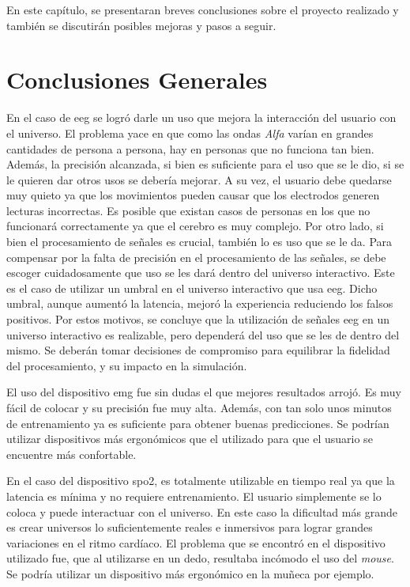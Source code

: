 En este capítulo, se presentaran breves conclusiones sobre el proyecto realizado y también se discutirán posibles mejoras y pasos a seguir.

\section{Conclusiones Generales}

En el caso de \acrshort{eeg} se logró darle un uso que mejora la interacción del usuario con el universo. El problema yace en que como las ondas \emph{Alfa} varían en grandes cantidades de persona a persona, hay en personas que no funciona tan bien. Además, la precisión alcanzada, si bien es suficiente para el uso que se le dio, si se le quieren dar otros usos se debería mejorar. A su vez, el usuario debe quedarse muy quieto ya que los movimientos pueden causar que los electrodos generen lecturas incorrectas. Es posible que existan casos de personas en los que no funcionará correctamente ya que el cerebro es muy complejo. Por otro lado, si bien el procesamiento de señales es crucial, también lo es uso que se le da. Para compensar por la falta de precisión en el procesamiento de las señales, se debe escoger cuidadosamente que uso se les dará dentro del universo interactivo. Este es el caso de utilizar un umbral en el universo interactivo que usa \acrshort{eeg}. Dicho umbral, aunque aumentó la latencia, mejoró la experiencia reduciendo los falsos positivos. Por estos motivos, se concluye que la utilización de señales \acrshort{eeg} en un universo interactivo es realizable, pero dependerá del uso que se les de dentro del mismo. Se deberán tomar decisiones de compromiso para equilibrar la fidelidad del procesamiento, y su impacto en la simulación.

El uso del dispositivo \acrshort{emg} fue sin dudas el que mejores resultados arrojó. Es muy fácil de colocar y su precisión fue muy alta. Además, con tan solo unos minutos de entrenamiento ya es suficiente para obtener buenas predicciones. Se podrían utilizar dispositivos más ergonómicos que el utilizado para que el usuario se encuentre más confortable.

En el caso del dispositivo \acrshort{spo2}, es totalmente utilizable en tiempo real ya que la latencia es mínima y no requiere entrenamiento. El usuario simplemente se lo coloca y puede interactuar con el universo. En este caso la dificultad más grande es crear universos lo suficientemente reales e inmersivos para lograr grandes variaciones en el ritmo cardíaco. El problema que se encontró en el dispositivo utilizado fue, que al utilizarse en un dedo, resultaba incómodo el uso del \emph{mouse}. Se podría utilizar un dispositivo más ergonómico en la muñeca por ejemplo.

